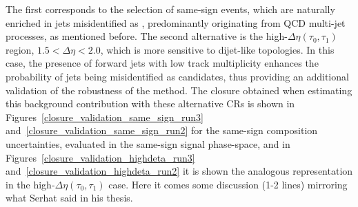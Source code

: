The first corresponds to the selection of same-sign events, which are naturally enriched in jets misidentified as \tauhad, predominantly originating from QCD multi-jet processes, as mentioned before.
The second alternative is the high-$\Delta\eta(\tau_0,\tau_1)$ region, $1.5 < \Delta\eta < 2.0$, which is more sensitive to dijet-like topologies. In this case, the presence of forward jets with low track multiplicity enhances the probability of jets being misidentified as \tauhad candidates, thus providing an additional validation of the robustness of the method. The closure obtained when estimating this background contribution with these alternative CRs is shown in Figures~\ref{closure_validation_same_sign_run3} and~\ref{closure_validation_same_sign_run2} for the same-sign composition uncertainties, evaluated in the same-sign \tauhadhad signal phase-space, and in Figures~\ref{closure_validation_highdeta_run3} and~\ref{closure_validation_highdeta_run2} it is shown the analogous representation in the high-$\Delta \eta (\tau_0,\tau_1)$ case.
Here it comes some discussion (1-2 lines) mirroring what Serhat said in his thesis.

